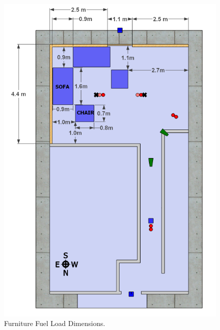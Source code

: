 \documentclass[12pt,oneside]{book}
\begin{document}
\begin{figure}[!ht]
	\includegraphics[width=.8\columnwidth]{../Figures/Pictures/DelCoSingleStoryFurnitureFuelLoad}
	\caption{Furniture Fuel Load Dimensions.}
	\label{fig:Furniture_Fuel_Load_Dimensions}
\end{figure}
\end{document}
